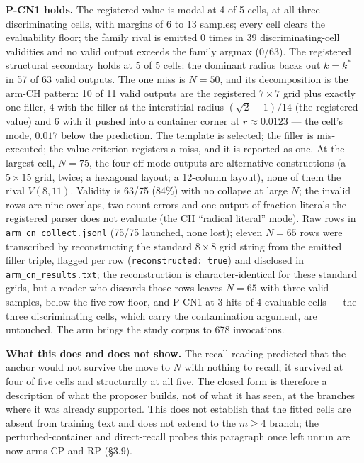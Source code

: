 \textbf{P-CN1 holds.} The registered value is modal at 4 of 5 cells, at all three
discriminating cells, with margins of 6 to 13 samples; every cell clears the evaluability
floor; the family rival is emitted 0 times in 39 discriminating-cell validities and no valid
output exceeds the family argmax (0/63). The registered structural secondary holds at 5 of 5
cells: the dominant radius backs out $k = k^*$ in 57 of 63 valid outputs. The one miss is
$N = 50$, and its decomposition is the arm-CH pattern: 10 of 11 valid outputs are the
registered $7 \times 7$ grid plus exactly one filler, 4 with the filler at the interstitial
radius $(\sqrt{2}-1)/14$ (the registered value) and 6 with it pushed into a container corner
at $r \approx 0.0123$ --- the cell's mode, $0.017$ below the prediction. The template is
selected; the filler is mis-executed; the value criterion registers a miss, and it is
reported as one. At the largest cell, $N = 75$, the four off-mode outputs are alternative
constructions (a $5 \times 15$ grid, twice; a hexagonal layout; a 12-column layout), none of them the
rival $V(8,11)$. Validity is 63/75 (84\%) with no collapse at large $N$; the invalid rows are
nine overlaps, two count errors and one output of fraction literals the registered parser
does not evaluate (the CH ``radical literal'' mode). Raw rows in
\texttt{arm\_cn\_collect.jsonl} (75/75 launched, none lost); eleven $N = 65$ rows were
transcribed by reconstructing the standard $8 \times 8$ grid string from the emitted filler
triple, flagged per row (\texttt{reconstructed: true}) and disclosed in \texttt{arm\_cn\_results.txt}; the reconstruction is character-identical for these standard grids, but a reader who discards those rows leaves $N = 65$ with three valid samples, below the five-row floor, and P-CN1 at 3 hits of 4 evaluable cells --- the three discriminating cells, which carry the contamination argument, are untouched. The arm brings the study corpus to 678
invocations.

\textbf{What this does and does not show.} The recall reading predicted that the anchor
would not survive the move to $N$ with nothing to recall; it survived at four of five cells
and structurally at all five. The closed form is therefore a description of what the
proposer builds, not of what it has seen, at the branches where it was already supported.
This does not establish that the fitted cells are absent from training text and does not
extend to the $m \ge 4$ branch; the perturbed-container and direct-recall probes this
paragraph once left unrun are now arms CP and RP (\S3.9).

